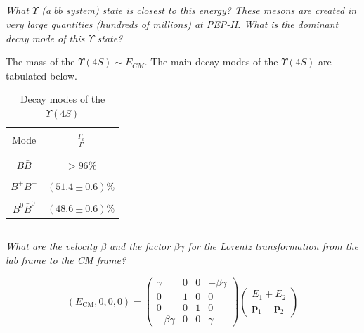 \documentclass{article}
\begin{document}
\subsection{}
\textit{What $\Upsilon$ (a $b \bar{b}$ system) state is closest to this energy? These mesons are created in very large quantities (hundreds of millions) at PEP-II. What is the dominant decay mode of this $\Upsilon$ state?}

The mass of the $\Upsilon(4S) \sim E_{CM}$. The main decay modes of the $\Upsilon(4S)$ are tabulated below. 

\begin{table}[h!]
    \centering
    \begin{tabular}{||c|c||}
        \hline \hline & \\
        Mode & $\frac{\Gamma_i}{\Gamma}$  \\& \\
         \hline & \\
         $B\bar B$ & $> 96\%$  \\
         \hline & \\
         $B^+ B^-$& $(51.4 \pm 0.6)\%$ \\
         \hline & \\
         $B^0 \bar{B}^0$& $(48.6 \pm 0.6)\%$ \\
         \hline\hline
    \end{tabular}
    \caption{Decay modes of the $\Upsilon(4S)$}
    \label{tab:my_label}
\end{table}

\subsection{}
\textit{What are the velocity $\beta$ and the factor $\beta \gamma$ for the Lorentz transformation from the lab frame to the CM frame?}

\begin{equation*}
    \left(E_{\mathrm{CM}}, 0,0,0\right)=\left(\begin{array}{cccc}
\gamma & 0 & 0 & -\beta \gamma \\
0 & 1 & 0 & 0 \\
0 & 0 & 1 & 0 \\
-\beta \gamma & 0 & 0 & \gamma
\end{array}\right)\left(\begin{array}{c}
E_{1}+E_{2} \\
\mathbf{p}_{1}+\mathbf{p}_{2}
\end{array}\right)
\end{equation*}
\end{document}
